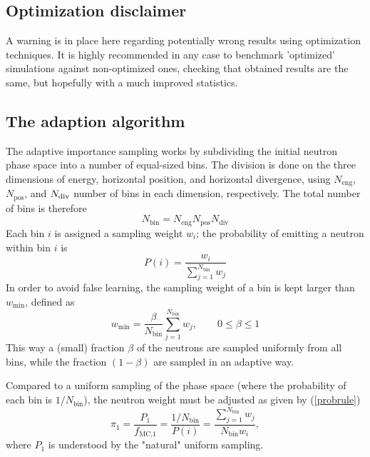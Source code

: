 \subsection{Optimization disclaimer}

A warning is in place here regarding potentially wrong results
using optimization techniques.
It is highly recommended in any case to benchmark 'optimized' simulations
against non-optimized ones, checking that obtained results are the same,
but hopefully with a much improved statistics.

\subsection{The adaption algorithm}

The adaptive importance sampling works by subdividing the initial
neutron phase space into a number of equal-sized bins. The division is
done on the three dimensions of energy, horizontal position, and
horizontal divergence, using $N_\textrm{eng}$, $N_\textrm{pos}$, and $N_{\rm
  div}$ number of bins in each dimension, respectively. The total number
of bins is therefore
\begin{equation}
N_\textrm{bin} = N_\textrm{eng} N_\textrm{pos} N_\textrm{div}
\end{equation}
Each bin $i$ is assigned a sampling weight $w_i$; the probability of
emitting a neutron within bin $i$ is
\begin{equation}
P(i) = \frac{w_i}{\sum_{j=1}^{N_\textrm{bin}} w_j}
\end{equation}
In order to avoid false learning, the sampling weight of a bin is
kept larger than $w_\textrm{min}$, defined as
\begin{equation}
w_\textrm{min} = \frac{\beta}{N_\textrm{bin}}\sum_{j=1}^{N_\textrm{bin}}w_j,\qquad
    0 \leq \beta \leq 1
\end{equation}
This way a (small) fraction $\beta$ of the neutrons are sampled
uniformly from all bins, while the fraction $(1 - \beta)$ are sampled in an adaptive way.

Compared to a uniform sampling of the phase space (where the probability
of each bin is $1/N_\textrm{bin}$), the neutron weight
must be adjusted as given by (\ref{probrule})
\begin{equation}
\pi_1 = \frac{P_1}{f_\textrm{MC,1}} =\frac{1/N_\textrm{bin}}{P(i)} =
    \frac{\sum_{j=1}^{N_\textrm{bin}} w_j}{N_\textrm{bin} w_i} ,
\end{equation}
where $P_1$ is understood by the "natural" uniform sampling.

